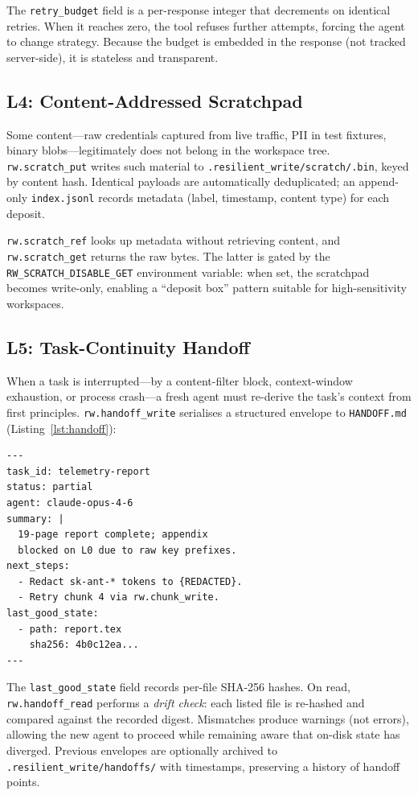 \documentclass[11pt,twocolumn]{article}
\newcommand{\tool}[1]{\texttt{#1}}
\begin{document}
The \texttt{retry\_budget} field is a per-response integer that
decrements on identical retries.  When it reaches zero, the tool
refuses further attempts, forcing the agent to change strategy.
Because the budget is embedded in the response (not tracked
server-side), it is stateless and transparent.

\subsection{L4: Content-Addressed Scratchpad}
\label{sec:l4}

Some content---raw credentials captured from live traffic, PII in
test fixtures, binary blobs---legitimately does not belong in the
workspace tree.  \tool{rw.scratch\_put} writes such material to
\texttt{.resilient\_write/\allowbreak scratch/.bin}, keyed by content
hash.  Identical payloads are automatically deduplicated; an
append-only \texttt{index.jsonl} records metadata (label, timestamp,
content type) for each deposit.

\tool{rw.scratch\_ref} looks up metadata without retrieving content,
and \tool{rw.scratch\_get} returns the raw bytes.  The latter is
gated by the \texttt{RW\_SCRATCH\_DISABLE\_GET} environment variable:
when set, the scratchpad becomes write-only, enabling a ``deposit
box'' pattern suitable for high-sensitivity workspaces.

\subsection{L5: Task-Continuity Handoff}
\label{sec:l5}

When a task is interrupted---by a content-filter block, context-window
exhaustion, or process crash---a fresh agent must re-derive the
task's context from first principles.  \tool{rw.handoff\_write}
serialises a structured envelope to \texttt{HANDOFF.md}
(Listing~\ref{lst:handoff}):

\begin{lstlisting}[language={},caption={HANDOFF.md front-matter (abbreviated).},label=lst:handoff]
---
task_id: telemetry-report
status: partial
agent: claude-opus-4-6
summary: |
  19-page report complete; appendix
  blocked on L0 due to raw key prefixes.
next_steps:
  - Redact sk-ant-* tokens to {REDACTED}.
  - Retry chunk 4 via rw.chunk_write.
last_good_state:
  - path: report.tex
    sha256: 4b0c12ea...
---
\end{lstlisting}

The \texttt{last\_good\_state} field records per-file SHA-256 hashes.
On read, \tool{rw.handoff\_read} performs a \emph{drift check}:
each listed file is re-hashed and compared against the recorded
digest.  Mismatches produce warnings (not errors), allowing the new
agent to proceed while remaining aware that on-disk state has
diverged.  Previous envelopes are optionally archived to
\texttt{.resilient\_write/handoffs/} with timestamps, preserving a
history of handoff points.
\end{document}
